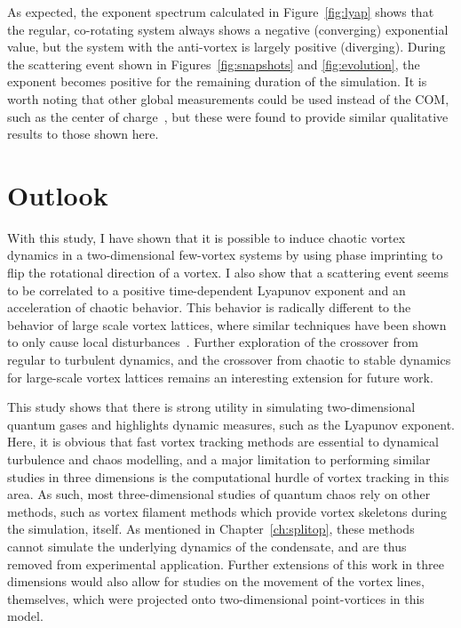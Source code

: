 As expected, the exponent spectrum calculated in Figure~\ref{fig:lyap} shows that the regular, co-rotating system always shows a negative (converging) exponential value, but the system with the anti-vortex is largely positive (diverging).
During the scattering event shown in Figures~\ref{fig:snapshots} and \ref{fig:evolution}, the exponent becomes positive for the remaining duration of the simulation.
It is worth noting that other global measurements could be used instead of the COM, such as the center of charge~\cite{kyriakopoulos2014}, but these were found to provide similar qualitative results to those shown here.


\section{Outlook}

With this study, I have shown that it is possible to induce chaotic vortex dynamics in a two-dimensional few-vortex systems by using phase imprinting to flip the rotational direction of a vortex.
I also show that a scattering event seems to be correlated to a positive time-dependent Lyapunov exponent and an acceleration of chaotic behavior.
This behavior is radically different to the behavior of large scale vortex lattices, where similar techniques have been shown to only cause local disturbances~\cite{o2016topo}.
Further exploration of the crossover from regular to turbulent dynamics, and the crossover from chaotic to stable dynamics for large-scale vortex lattices remains an interesting extension for future work.

This study shows that there is strong utility in simulating two-dimensional quantum gases and highlights dynamic measures, such as the Lyapunov exponent.
Here, it is obvious that fast vortex tracking methods are essential to dynamical turbulence and chaos modelling, and a major limitation to performing similar studies in three dimensions is the computational hurdle of vortex tracking in this area.
As such, most three-dimensional studies of quantum chaos rely on other methods, such as vortex filament methods which provide vortex skeletons during the simulation, itself.
As mentioned in Chapter~\ref{ch:splitop}, these methods cannot simulate the underlying dynamics of the condensate, and are thus removed from experimental application.
Further extensions of this work in three dimensions would also allow for studies on the movement of the vortex lines, themselves, which were projected onto two-dimensional point-vortices in this model.

